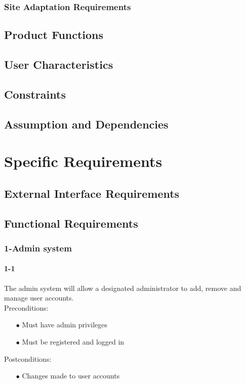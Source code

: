 \documentclass[a4paper,12pt]{article}
\begin{document}
\subsubsection{Site Adaptation Requirements}
\subsection{Product Functions}
\subsection{User Characteristics}
\subsection{Constraints}
\subsection{Assumption and Dependencies}

\section{Specific Requirements}
\subsection{External Interface Requirements}
\subsection{Functional Requirements}
\subsubsection{1-Admin system}
\paragraph{1-1}
The admin system will allow a designated administrator to add, remove and manage user accounts.\\
Preconditions:
\begin{itemize} 
	\item[$\bullet$] Must have admin privileges
	\item[$\bullet$] Must be registered and logged in
\end{itemize}
Postconditions:
\begin{itemize}
	\item[$\bullet$] Changes made to user accounts
\end{itemize}
\end{document}
